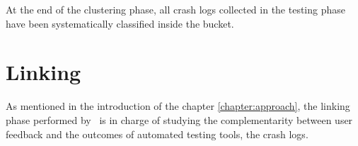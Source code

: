 At the end of the clustering phase, all crash logs collected in the testing phase have been systematically classified inside the bucket. 



\section{Linking}
\label{tool: linking}
As mentioned in the introduction of the chapter \ref{chapter:approach}, the linking phase performed by \toolname\ is in charge of studying the complementarity between user feedback and the outcomes of automated testing tools, \ie the crash logs. 



